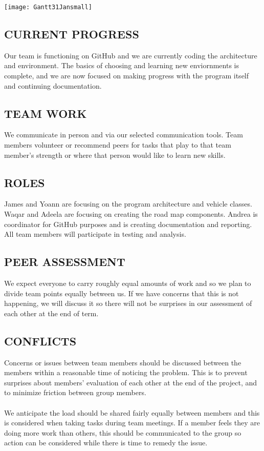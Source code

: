 \documentclass[11pt]{article}
\begin{document}
 
\texttt{[image: Gantt31Jansmall]}



\subsection*{CURRENT PROGRESS}

Our team is functioning on GitHub and we are currently coding the architecture and 
environment. The basics of choosing and learning new enviornments is complete, and we
are now focused on making progress with the program itself and continuing documentation.
 

\subsection*{TEAM WORK}

We communicate in person and via our selected communication tools.  Team members 
volunteer or recommend peers for tasks that play to that team member's strength or where 
that person would like to learn new skills.


\subsection*{ROLES}

James and Yoann are focusing on the program architecture and vehicle classes. Waqar and 
Adeela are focusing on creating the road map components. Andrea is coordinator for GitHub 
purposes and is creating documentation and reporting. All team members will participate 
in testing and analysis.


\subsection*{PEER ASSESSMENT}

We expect everyone to carry roughly equal amounts of work and so we plan to divide team 
points equally between us. If we have concerns that this is not happening, we will 
discuss it so there will not be surprises in our assessment of each other at the end of term.


\subsection*{CONFLICTS}

Concerns or issues between team members should be discussed between the members within 
a reasonable time of noticing the problem. This is to prevent surprises about members' 
evaluation of each other at the end of the project, and to minimize friction between 
group members.
\\ \\
We anticipate the load should be shared fairly equally between members and 
this is considered when taking tasks during team meetings. If a member feels 
they are doing more work than others, this should be communicated to the group so action 
can be considered while there is time to remedy the issue.
\end{document}
